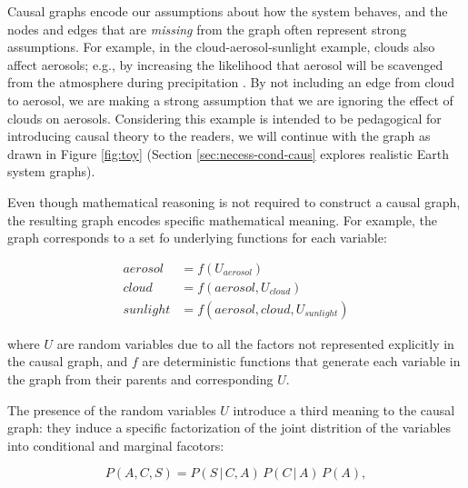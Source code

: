 \documentclass[12pt]{article}
\begin{document}
Causal graphs encode our assumptions about how the system behaves, and
the nodes and edges that are \textit{missing} from the graph often
represent strong assumptions. For example, in the
cloud-aerosol-sunlight example, clouds also affect aerosols; e.g., by
increasing the likelihood that aerosol will be scavenged from the
atmosphere during precipitation \citep[e.g.,][]{radke-scavenge-1980,
  JURADO20087931, blanco-alegre2018}. By not including an edge from
cloud to aerosol, we are making a strong assumption that we are
ignoring the effect of clouds on aerosols. Considering this example is
intended to be pedagogical for introducing causal theory to the
readers, we will continue with the graph as drawn in Figure
\ref{fig:toy} (Section \ref{sec:necess-cond-caus} explores realistic
Earth system graphs).

Even though mathematical reasoning is not required to construct a
causal graph, the resulting graph encodes specific mathematical
meaning. For example, the graph corresponds to a set fo underlying
functions for each variable:

\begin{align}
  \label{eq:2}
  aerosol &= f(U_{aerosol}) \\
  cloud &= f(aerosol, U_{cloud})\\
  sunlight &= f(aerosol, cloud, U_{sunlight})
\end{align}

where $U$ are random variables due to all the factors not represented
explicitly in the causal graph, and $f$ are deterministic functions
that generate each variable in the graph from their parents and
corresponding $U$.

The presence of the random variables $U$ introduce
a third meaning to the causal graph: they induce a specific
factorization of the joint distrition of the variables into
conditional and marginal facotors:

\begin{equation}
  P(A, C, S) = P(S \, | \,C, A) \, P(C \, | \, A) \, P(A),
\end{equation}
\end{document}
